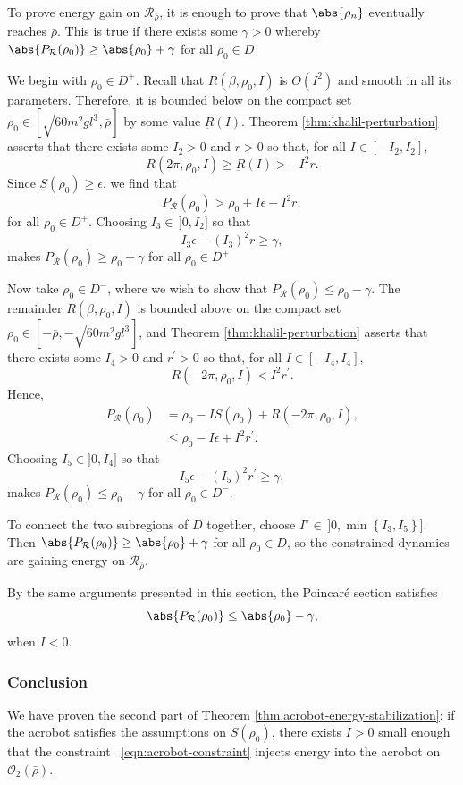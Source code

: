 To prove energy gain on \(\mathcal{R}_{\bar{\rho}}\), it is
enough to prove that \(\abs{\rho_n}\) eventually reaches \(\bar{\rho}\).
This is true if there exists some \(\gamma > 0\)
whereby \(\abs{P_\mathcal{R}(\rho_0)} \geq \abs{\rho_0} + \gamma\) for all 
\(\rho_0 \in D\)

We begin with \(\rho_0 \in D^+\).
Recall that \(R(\beta,\rho_0,I)\) is \(O(I^2)\) and smooth in all
its parameters.
Therefore, it is bounded below on the compact set
\(\rho_0 \in \left[\sqrt{60m^2gl^3},\bar{\rho}\right]\) by some value
\(\underbar{R}(I)\).
Theorem \ref{thm:khalil-perturbation} asserts that there exists some 
\(I_2 > 0\) and \(r > 0\) so that, for all \(I \in [-I_2,I_2]\),
\[
    R(2\pi,\rho_0,I) \geq \underbar{R}(I) > -I^2r
    .
\]
Since \(S(\rho_0) \geq \epsilon\), we find that
\[
    P_\mathcal{R}(\rho_0) > \rho_0 + I\epsilon -I^2r
    ,
\]
for all \(\rho_0 \in D^+\).
Choosing \(I_3 \in \,]0,I_2]\) so that
\[
    I_3\epsilon - (I_3)^2 r \geq \gamma
    ,
\] 
makes \(P_\mathcal{R}(\rho_0) \geq \rho_0 + \gamma\) for all 
\(\rho_0 \in D^+\)

Now take \(\rho_0 \in D^-\), where we wish to show that 
\(P_\mathcal{R}(\rho_0) \leq \rho_0 - \gamma\).
The remainder \(R(\beta,\rho_0,I)\) is bounded above on the compact set 
\(\rho_0 \in \left[-\bar{\rho},-\sqrt{60m^2gl^3}\right]\), and 
Theorem \ref{thm:khalil-perturbation} asserts that there exists some 
\(I_4 > 0\) and \(r^\prime > 0\) so that, for all \(I \in [-I_4,I_4]\), 
\[
    R(-2\pi,\rho_0,I) < I^2 r^\prime
    .
\]
Hence,
\begin{align*}
    P_\mathcal{R}(\rho_0)
    &= \rho_0 - IS(\rho_0) + R(-2\pi,\rho_0,I)
    , \\
    &\leq \rho_0 - I\epsilon + I^2r^\prime
    .
\end{align*}
Choosing \(I_5 \in ]0,I_4]\) so that 
\[
    I_5 \epsilon - (I_5)^2r^\prime \geq \gamma
    ,
\] 
makes \(P_\mathcal{R}(\rho_0) \leq \rho_0 - \gamma\) for all 
\(\rho_0 \in D^-\).

To connect the two subregions of \(D\) together, choose
\(I^\star \in\, ]0,\min\left\{I_3,I_5\right\}]\).
Then \(\abs{P_\mathcal{R}(\rho_0)} \geq \abs{\rho_0} + \gamma\) for all
\(\rho_0 \in D\), so the constrained dynamics are gaining energy on 
\(\mathcal{R}_{\bar{\rho}}\).

By the same arguments presented in this section, the Poincar\'{e} section
satisfies 
\[
    \abs{P_\mathcal{R}(\rho_0)} \leq \abs{\rho_0} - \gamma
    ,
\]
when \(I < 0\).

\subsubsection*{Conclusion}
We have proven the second part of Theorem
\ref{thm:acrobot-energy-stabilization}: if the acrobot satisfies the assumptions
on \(S(\rho_0)\), there exists \(I > 0\) small enough that the constraint
~\eqref{eqn:acrobot-constraint} injects energy into the acrobot on
\(\mathcal{O}_2(\bar{\rho})\).

